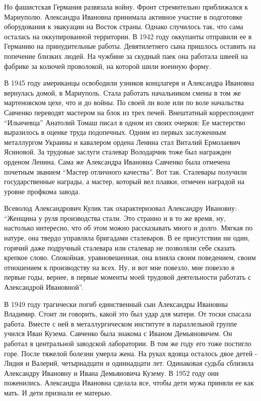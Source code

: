 
Но фашистская Германия развязала войну. Фронт стремительно приближался к
Мариуполю. Александра Ивановна принимала активное участие в подготовке
оборудования к эвакуации на Восток страны. Однако случилось так, что сама
осталась на оккупированной территории. В 1942 году оккупанты отправили ее в
Германию на принудительные работы. Девятилетнего сына пришлось оставить на
попечение близких людей. На чужбине за скудный паек она работала швеей на
фабрике за колючей проволокой, на которой шили военную форму.

В 1945 году американцы освободили узников концлагеря и Александра Ивановна
вернулась домой, в Мариуполь. Стала работать начальником смены в том же
мартеновском цехе, что и до войны. По своей ли воле или по воле начальства
Савченко переводят мастером на блок из трех печей. Внештатный корреспондент
\enquote{Ильичевца} Анатолий Томаш писал в одном из своих очерков: Ее мастерство
выразилось в оценке труда подопечных. Одним из первых заслуженным металлургом
Украины и кавалером ордена Ленина стал Виталий Ермолаевич Ясиновой. За трудовые
заслуги сталевар Володарчик тоже был награжден орденом Ленина. Сама же
Александра Ивановна Савченко была отмечена почетным званием \enquote{Мастер
отличного качества}. Вот так. Сталевары получили государственные награды, а
мастер, который вел плавки, отмечен наградой на уровне профкома завода.


Всеволод Александрович Кулик так охарактеризовал Александру Ивановну: \enquote{Женщина
у руля производства стали. Это странно и в то же время, ну, настолько
интересно, что об этом можно рассказывать много и долго. Мягкая по натуре, она
твердо управляла бригадами сталеваров. В ее присутствии ни один, горячий даже
подручный сталевара или сталевар не позволяли себе сказать крепкое слово.
Спокойная, уравновешенная, она влияла своим поведением, своим отношением к
производству на всех. Ну, и вот мне повезло, мне повезло в первые годы, вернее,
в первые моменты моей трудовой деятельности работать с Александрой Ивановной}.

В 1949 году трагически погиб единственный сын Александры Ивановны Владимир.
Стоит ли говорить, какой это был удар для матери. От тоски спасала работа.
Вместе с ней в металлургическом институте в параллельной группе учился Иван
Кузема. Савченко была знакома с Иваном Демьяновичем. Он работал в центральной
заводской лаборатории. В том же году его тоже постигло  горе. После тяжелой
болезни умерла жена. На руках вдовца осталось двое детей - Лидия и Валерий,
четырнадцати и одиннадцати лет. Одинаковая судьба сблизила Александру Ивановну
и Ивана Демьяновича Кузему. В 1952 году они поженились. Александра Ивановна
сделала все, чтобы дети мужа приняли ее как мать. И дети признали ее матерью.

